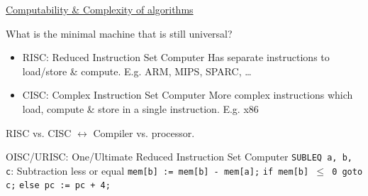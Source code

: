 \par{
	\noindent\underline{Computability \& Complexity of algorithms}
	\par{
		\noindent
		What is the minimal machine that is still universal?
		\begin{itemize}
			\item{
				RISC: Reduced Instruction Set Computer \newline
				Has separate instructions to load/store \& compute. \newline
				E.g. ARM, MIPS, SPARC, \ldots
			}
			\item{
				CISC: Complex Instruction Set Computer \newline
				More complex instructions which load, compute \& store in a single instruction. \newline
				E.g. x86
			}
		\end{itemize}
		RISC vs. CISC $\leftrightarrow$ Compiler vs. processor.
	}
	\par{
		\noindent
		OISC/URISC: One/Ultimate Reduced Instruction Set Computer \newline\newline
		\texttt{SUBLEQ a, b, c}: Subtraction less or equal \newline
		\indent\texttt{mem[b] := mem[b] - mem[a];} \newline
		\indent\texttt{if mem[b] $\le$ 0 goto c;} \newline
		\indent\texttt{else pc := pc + 4;}
	}
}
